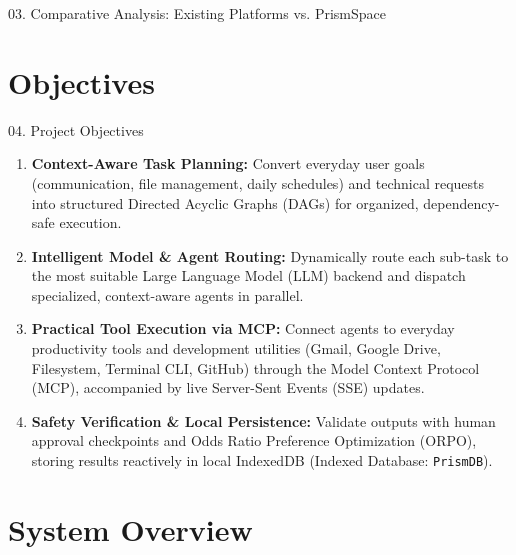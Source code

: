 \documentclass[aspectratio=169,10pt]{beamer}
\begin{document}
\begin{frame}[t]{03. Comparative Analysis: Existing Platforms vs. PrismSpace}
\end{frame}

\section{Objectives}

\begin{frame}[t]{04. Project Objectives}
\vspace{0.55em}
  \begin{minipage}{0.94\linewidth}
  \fontsize{8.6}{11.2}\selectfont
  \begin{enumerate}\setlength{\itemsep}{12pt}\setlength{\leftmargin}{0.34in}
    \item \textbf{Context-Aware Task Planning:} Convert everyday user goals (communication, file management, daily schedules) and technical requests into structured Directed Acyclic Graphs (DAGs) for organized, dependency-safe execution.
    \item \textbf{Intelligent Model \& Agent Routing:} Dynamically route each sub-task to the most suitable Large Language Model (LLM) backend and dispatch specialized, context-aware agents in parallel.
    \item \textbf{Practical Tool Execution via MCP:} Connect agents to everyday productivity tools and development utilities (Gmail, Google Drive, Filesystem, Terminal CLI, GitHub) through the Model Context Protocol (MCP), accompanied by live Server-Sent Events (SSE) updates.
    \item \textbf{Safety Verification \& Local Persistence:} Validate outputs with human approval checkpoints and Odds Ratio Preference Optimization (ORPO), storing results reactively in local IndexedDB (Indexed Database: \texttt{PrismDB}).
  \end{enumerate}
  \end{minipage}
\end{frame}

\section{System Overview}
\end{document}
